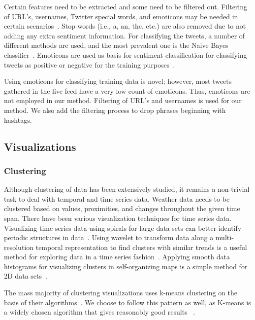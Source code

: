 Certain features need to be extracted and some need to be filtered out. Filtering of URL's, usernames, Twitter special words, and emoticons may be needed in certain scenarios~\cite{pak2010twitter}. Stop words (i.e., a, an, the, etc.) are also removed due to not adding any extra sentiment information. For classifying the tweets, a number of different methods are used, and the most prevalent one is the Naive Bayes classifier~\cite{pak2010twitter}. Emoticons are used as basis for sentiment classification for classifying tweets as positive or negative for the training purposes~\cite{keller2005warm,pak2010twitter}.

Using emoticons for classifying training data is novel; however, most tweets gathered in the live feed have a very low count of emoticons. Thus, emoticons are not employed in our method. Filtering of URL's and usernames is used for our method. We also add the filtering process to drop phrases beginning with hashtags.

\subsection{Visualizations}

\subsubsection{Clustering}

Although clustering of data has been extensively studied, it remains a non-trivial task to deal with temporal and time series data. Weather data needs to be clustered based on values, proximities, and changes throughout the given time span. There have been various visualization techniques for time series data. Visualizing time series data using spirals for large data sets can better identify periodic structures in data~\cite{pak2010twitter}. Using wavelet to transform data along a multi-resolution temporal representation to find clusters with similar trends is a useful method for exploring data in a time series fashion~\cite{woodring2009multiscale}. Applying smooth data histograms for visualizing clusters in self-organizing maps is a simple method for 2D data sets~\cite{pampalk2002using}.

The mass majority of clustering visualizations uses k-means clustering on the basis of their algorithms~\cite{li2014nasty,weber2001visualizing}. We choose to follow this pattern as well, as K-means is a widely chosen algorithm that gives reasonably good results ~\cite{weber2001visualizing,jain2010data}.

